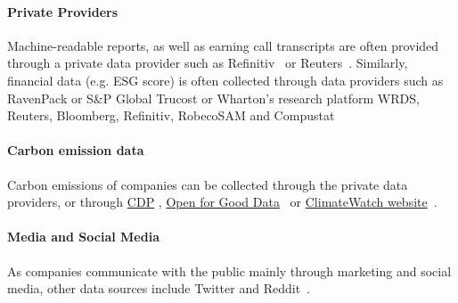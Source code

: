 \paragraph{Private Providers} Machine-readable reports, as well as earning call transcripts are often provided through a private data provider such as Refinitiv~\cite{SAUTNER_cliamte_change_exp, bingler2023cheaptalkspecificitysentiment, stammbach_environmental_2023, Friederich_climate_risk_disclosure, bjarne_brie_mandatory_2022, LEE_greenwashing, nicolas_webersinke_climatebert_2021} or Reuters~\cite{liCorporateClimateRisk2020, clarkson_nlp_us_csr}. Similarly, financial data (e.g. ESG score) is often collected through data providers such as RavenPack or S\&P Global Trucost or Wharton’s research platform WRDS, Reuters, Bloomberg, Refinitiv, RobecoSAM and Compustat~\cite{liCorporateClimateRisk2020, SAUTNER_cliamte_change_exp, Mehra_2022, Greenscreen, clarkson_nlp_us_csr, schimanski_bridging_2023}

\paragraph{Carbon emission data} Carbon emissions of companies can be collected through the private data providers, or through \href{https://www.cdp.net/en/}{CDP} \cite{spokoyny2023answering}, \href{https://www.anderson.ucla.edu/about/centers/impactanderson/open-for-good-transparency-index}{Open for Good Data}~\cite{avalon_vinella_leveraging_2023} or \href{https://www.climatewatchdata.org/}{ClimateWatch website}~\cite{krausEnhancingLargeLanguage2023}.


\paragraph{Media and Social Media} As companies communicate with the public mainly through marketing and social media, other data sources include Twitter and Reddit~\cite{vinicius_woloszyn_towards_2021, luo_detecting_2020, vaid-etal-2022-towards, coanComputerassistedClassificationContrarian2021, divinus_oppong-tawiah_corporate_2023, Greenscreen}.

